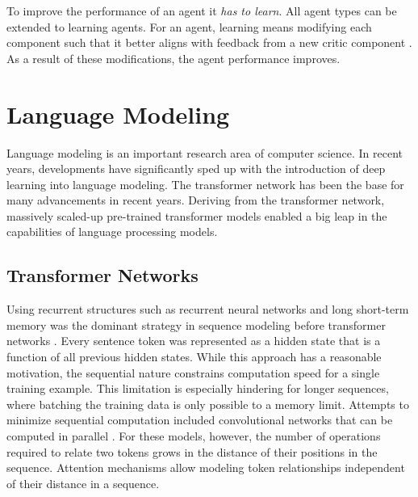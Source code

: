 \documentclass[../main.tex]{subfiles}
\begin{document}
To improve the performance of an agent it \emph{has to learn}.
All agent types can be extended to learning agents.
For an agent, learning means modifying each component
such that it better aligns with feedback from a new critic component \autocite{Russel2022}.
As a result of these modifications, the agent performance improves.

\section{Language Modeling}
\label{sec:language_modeling}
Language modeling is an important research area of computer science.
In recent years, developments have significantly sped up with the introduction of deep learning into language modeling.
The transformer network \cite{Vaswani2017} has been the base for many advancements in recent years.
Deriving from the transformer network,
massively scaled-up pre-trained transformer models \autocite{Brown2020}
enabled a big leap in the capabilities of language processing models.


\subsection{Transformer Networks}
\label{subsec:transformer}

Using recurrent structures such as recurrent neural networks
and long short-term memory \cite{Chung2014}
was the dominant strategy in sequence modeling
before transformer networks \cite{Vaswani2017}.
Every sentence token was represented as a hidden state
that is a function of all previous hidden states.
While this approach has a reasonable motivation,
the sequential nature constrains computation speed for a single training example.
This limitation is especially hindering for longer sequences,
where batching the training data is only possible to a memory limit.
Attempts to minimize sequential computation included convolutional networks
that can be computed in parallel \cite{Gehring2017}.
For these models, however,
the number of operations required to relate two tokens
grows in the distance of their positions in the sequence.
Attention mechanisms allow modeling token relationships
independent of their distance in a sequence.
\end{document}

